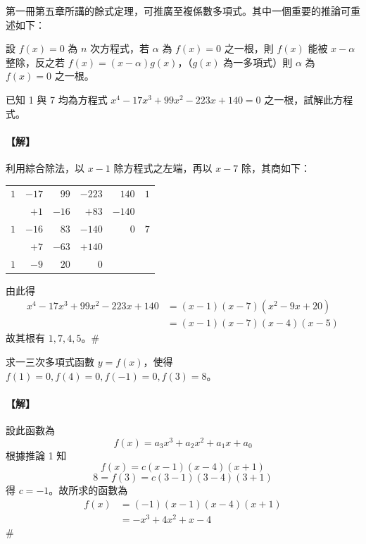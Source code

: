 第一冊第五章所講的餘式定理，可推廣至複係數多項式。其中一個重要的推論可重述如下：

\begin{corollary}[因式定理]\label{cor:b6-2-1}
設 $f(x)=0$ 為 $n$ 次方程式，若 $\alpha$ 為 $f(x)=0$ 之一根，則 $f(x)$ 能被 $x-\alpha$ 整除，反之若 $f(x) = (x-\alpha)g(x)$，（$g(x)$ 為一多項式）則 $\alpha$ 為 $f(x)=0$ 之一根。
\end{corollary}

\begin{example}\label{ex:b6-2-1}
已知 1 與 7 均為方程式 $x^4 - 17x^3 + 99x^2 - 223x + 140 = 0$ 之一根，試解此方程式。
\end{example}

\paragraph{【解】}
利用綜合除法，以 $x-1$ 除方程式之左端，再以 $x-7$ 除，其商如下：
\begin{center}
\renewcommand{\arraystretch}{1.2}
\begin{tabular}{rrrrr|r}
$1$ & $-17$ & $99$ & $-223$ & $140$ & $1$ \\
    & $+1$  & $-16$ & $+83$ & $-140$ & \\
\hline
$1$ & $-16$ & $83$ & $-140$ & $0$ & $7$ \\
    & $+7$  & $-63$ & $+140$ & & \\
\hline
$1$ & $-9$  & $20$ & $0$ & &
\end{tabular}
\end{center}
由此得
\begin{align*}
x^4 - 17x^3 + 99x^2 - 223x + 140 &= (x-1)(x-7)(x^2 - 9x + 20) \\
&= (x-1)(x-7)(x-4)(x-5)
\end{align*}
故其根有 $1, 7, 4, 5$。\hfill$\#$

\begin{example}\label{ex:b6-2-2}
求一三次多項式函數 $y=f(x)$，使得 $f(1)=0, f(4)=0, f(-1)=0, f(3)=8$。
\end{example}

\paragraph{【解】}
設此函數為
\begin{equation}
f(x) = a_3 x^3 + a_2 x^2 + a_1 x + a_0 \label{eq:b6-2-1-1}
\end{equation}
根據推論 1 知
\begin{equation}
f(x) = c(x-1)(x-4)(x+1) \label{eq:b6-2-1-2}
\end{equation}
\[ 8 = f(3) = c(3-1)(3-4)(3+1) \]
得 $c = -1$。故所求的函數為
\begin{align*}
f(x) &= (-1)(x-1)(x-4)(x+1) \\
&= -x^3 + 4x^2 + x - 4
\end{align*}
\hfill$\#$

